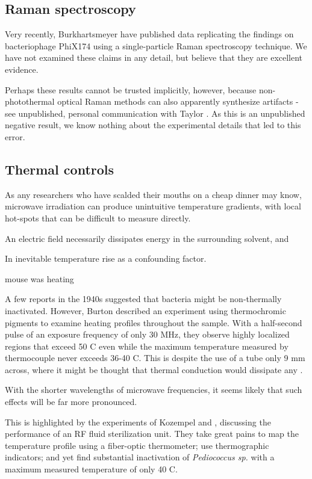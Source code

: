 \documentclass[paper.tex]{subfiles}
\begin{document}
\begin{multicols}{1}
\subsection{Raman spectroscopy}

Very recently, Burkhartsmeyer \cite{Optical2020} have published data replicating the findings on bacteriophage PhiX174 using a single-particle Raman spectroscopy technique. We have not examined these claims in any detail, but believe that they are excellent evidence.

Perhaps these results cannot be trusted implicitly, however, because non-photothermal optical Raman methods can also apparently synthesize artifacts - see unpublished, personal communication with Taylor \cite{mechanisms1981}. As this is an unpublished negative result, we know nothing about the experimental details that led to this error.

\subsection{Thermal controls}

As any researchers who have scalded their mouths on a cheap dinner may know, microwave irradiation can produce unintuitive temperature gradients, with local hot-spots that can be difficult to measure directly.

An electric field necessarily dissipates energy in the surrounding solvent, and 

In inevitable temperature rise as a confounding factor. 

mouse was heating

A few reports in the 1940s suggested that bacteria might be non-thermally inactivated. However, Burton\cite{Effects1950} described an experiment using thermochromic pigments to examine heating profiles throughout the sample. With a half-second pulse of an exposure frequency of only 30 MHz, they observe highly localized regions that exceed 50 C even while the maximum temperature measured by thermocouple never exceeds 36-40 C. This is despite the use of a tube only 9 mm across, where it might be thought that thermal conduction would dissipate any . 

With the shorter wavelengths of microwave frequencies, it seems likely that such effects will be far more pronounced.

This is highlighted by the experiments of Kozempel \cite{Preliminary1997} and \cite{Inactivationa}, discussing the performance of an RF fluid sterilization unit. They take great pains to map the temperature profile using a fiber-optic thermometer; use thermographic indicators; and yet find substantial inactivation of {\it Pediococcus sp.} with a maximum measured temperature of only 40 C.


\end{multicols}
\end{document}
